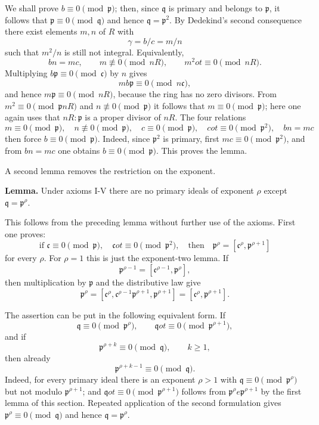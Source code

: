 \documentclass[11pt]{article}
\begin{document}
We shall prove \(b\equiv0\pmod{\mathfrak p}\); then, since
\(\mathfrak q\) is primary and belongs to \(\mathfrak p\), it follows
that \(\mathfrak p\equiv0\pmod{\mathfrak q}\) and hence
\(\mathfrak q=\mathfrak p^2\). By Dedekind's second consequence there
exist elements \(m,n\) of \(R\) with \[
  \gamma=b/c=m/n
\] such that \(m^2/n\) is still not integral. Equivalently, \[
  bn=mc,
  \qquad m\not\equiv0\pmod{nR},
  \qquad m^2
ot\equiv0\pmod{nR}.
\] Multiplying \(b\mathfrak p\equiv0\pmod{\mathfrak c}\) by \(n\) gives
\[
  mb\mathfrak p\equiv0\pmod{n\mathfrak c},
\] and hence \(m\mathfrak p\equiv0\pmod{nR}\), because the ring has no
zero divisors. From \(m^2\equiv0\pmod{\mathfrak p nR}\) and
\(n\not\equiv0\pmod{\mathfrak p}\) it follows that
\(m\equiv0\pmod{\mathfrak p}\); here one again uses that
\(nR:\mathfrak p\) is a proper divisor of \(nR\). The four relations \[
  m\equiv0\pmod{\mathfrak p},
  \quad n\not\equiv0\pmod{\mathfrak p},
  \quad c\equiv0\pmod{\mathfrak p},
  \quad c
ot\equiv0\pmod{\mathfrak p^2},
  \quad bn=mc
\] then force \(b\equiv0\pmod{\mathfrak p}\). Indeed, since
\(\mathfrak p^2\) is primary, first \(mc\equiv0\pmod{\mathfrak p^2}\),
and from \(bn=mc\) one obtains \(b\equiv0\pmod{\mathfrak p}\). This
proves the lemma.

A second lemma removes the restriction on the exponent.

\textbf{Lemma.} Under axioms I-V there are no primary ideals of exponent
\(\rho\) except \(\mathfrak q=\mathfrak p^{\rho}\).

This follows from the preceding lemma without further use of the axioms.
First one proves: \[
  \text{if }\mathfrak c\equiv0\pmod{\mathfrak p},\quad
  \mathfrak c
ot\equiv0\pmod{\mathfrak p^2},
  \quad\text{then}\quad
  \mathfrak p^{\rho}=[\mathfrak c^{\rho},\mathfrak p^{\rho+1}]
\] for every \(\rho\). For \(\rho=1\) this is just the exponent-two
lemma. If \[
  \mathfrak p^{\rho-1}=[\mathfrak c^{\rho-1},\mathfrak p^{\rho}],
\] then multiplication by \(\mathfrak p\) and the distributive law give
\[
  \mathfrak p^{\rho}=
  [\mathfrak c^{\rho},\mathfrak c^{\rho-1}\mathfrak p^{\rho+1},\mathfrak p^{\rho+1}]
  =[
    \mathfrak c^{\rho},\mathfrak p^{\rho+1}].
\]

The assertion can be put in the following equivalent form. If \[
  \mathfrak q\equiv0\pmod{\mathfrak p^{\rho}},
  \qquad \mathfrak q
ot\equiv0\pmod{\mathfrak p^{\rho+1}},
\] and if \[
  \mathfrak p^{\rho+k}\equiv0\pmod{\mathfrak q},\qquad k\ge1,
\] then already \[
  \mathfrak p^{\rho+k-1}\equiv0\pmod{\mathfrak q}.
\] Indeed, for every primary ideal there is an exponent \(\rho>1\) with
\(\mathfrak q\equiv0\pmod{\mathfrak p^{\rho}}\) but not modulo
\(\mathfrak p^{\rho+1}\); and \(\mathfrak q
ot\equiv0\pmod{\mathfrak p^{\rho+1}}\) follows from \(\mathfrak p^{\rho}
e\mathfrak p^{\rho+1}\) by the first lemma of this section. Repeated
application of the second formulation gives
\(\mathfrak p^{\rho}\equiv0\pmod{\mathfrak q}\) and hence
\(\mathfrak q=\mathfrak p^{\rho}\).
\end{document}
